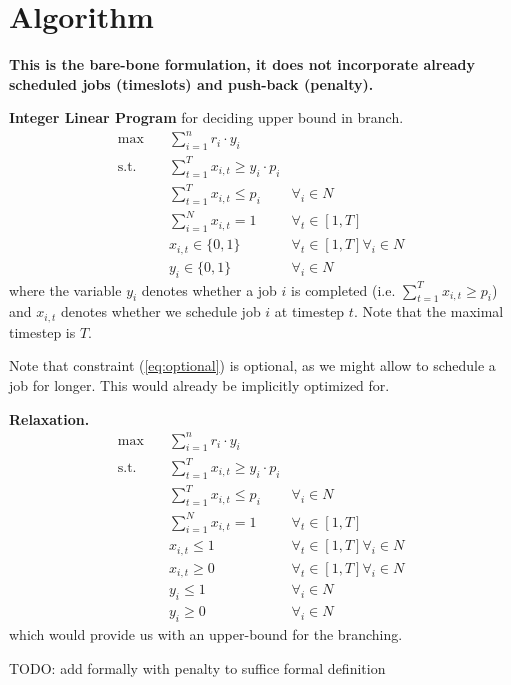 \section{Algorithm}

{
\color{red}
\textbf{This is the bare-bone formulation, it does not incorporate already scheduled jobs (timeslots) and push-back (penalty).}
}


\textbf{Integer Linear Program} for deciding upper bound in branch.
\begin{align}
    \max \quad & \sum_{i=1}^n r_i \cdot y_i \\
    \text{s.t.} \quad & \sum_{t=1}^T x_{i, t} \geq y_i \cdot p_i \\
    & \sum_{t=1}^T x_{i, t} \leq p_i  &\forall_i \in N \label{eq:optional}
    \\
    & \sum_{i=1}^N x_{i, t} = 1  &\forall_t \in [1, T] \\
    & x_{i, t} \in \{0, 1\} & \forall_t \in [1, T] \forall_i \in N \\
    & y_i \in \{0, 1\} & \forall_i \in N 
\end{align}
where the variable $y_i$ denotes whether a job $i$ is completed (i.e. $\sum_{t=1}^T x_{i, t} \geq p_i$) and $x_{i, t}$ denotes whether we schedule job $i$ at timestep $t$. Note that the maximal timestep is $T$.

Note that constraint (\ref{eq:optional}) is optional, as we might allow to schedule a job for longer. This would already be implicitly optimized for.

\textbf{Relaxation.}
\begin{align}
    \max \quad & \sum_{i=1}^n r_i \cdot y_i \\
    \text{s.t.} \quad & \sum_{t=1}^T x_{i, t} \geq y_i \cdot p_i \\
    & \sum_{t=1}^T x_{i, t} \leq p_i  &\forall_i \in N \\
    & \sum_{i=1}^N x_{i, t} = 1  &\forall_t \in [1, T] \\
    & x_{i, t} \leq 1 & \forall_t \in [1, T] \forall_i \in N \\
    & x_{i, t} \geq 0 & \forall_t \in [1, T] \forall_i \in N \\
    & y_i \leq 1 & \forall_i \in N \\
    & y_i \geq 0 & \forall_i \in N 
\end{align}
which would provide us with an upper-bound for the branching.

TODO: add formally with penalty to suffice formal definition

\pagebreak
